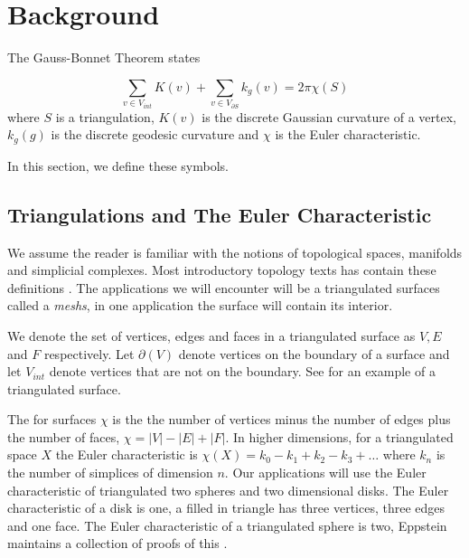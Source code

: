 \section{Background}\label{sec:background}
\label{sec:cast}
The Gauss-Bonnet Theorem states

\begin{theorem} \label{thm:g-b}

$$\sum_{v\in V_{int}} K(v) + \sum_{v\in V_{\partial S}} k_g(v) = 2\pi \chi(S)$$
where $S$ is a triangulation, $K(v)$ is the discrete Gaussian curvature
of a vertex, $k_g(g)$ is the discrete geodesic curvature and
$\chi$ is the Euler characteristic.
\end{theorem}
In this section, we define these symbols.





\subsection{Triangulations and The Euler Characteristic}

We assume the reader is familiar with the notions
of topological spaces, manifolds and simplicial complexes.
Most introductory topology texts has contain these definitions \cite{jm08,munkres}.
The applications we will encounter will be a triangulated surfaces
called a \emph{meshs}, in one application the surface will contain its interior.


We denote the set of vertices, edges and faces in a triangulated surface as 
$V, E$ and $F$ respectively.
Let $\partial(V)$ denote vertices on the boundary of a surface and let $V_{int}$ 
denote vertices that are not on the boundary.
See  for an example of a triangulated surface.



The  for surfaces $\chi$ is the 
the number of vertices minus the number of edges plus  the number of faces, $\chi=|V|-|E|+|F|.$
In higher dimensions, for a triangulated space $X$ the Euler characteristic is 
$\chi(X)=k_0-k_1+k_2-k_3+\ldots$ where $k_n$ is the number of simplices of dimension $n.$
Our applications will use the Euler characteristic of triangulated two spheres and two 
dimensional
disks.
The Euler characteristic of a disk is one, a filled in triangle has three vertices, three
edges and one face.
The Euler characteristic of a triangulated sphere is two, Eppstein maintains a 
collection of proofs of this \cite{eppstein-proofs}. 



